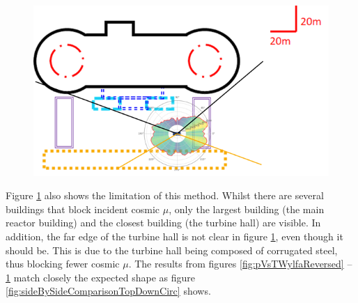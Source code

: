  \begin{figure}[!h]
 \centering
 \includegraphics[width=0.7\linewidth]{Chapter5/Figs/wylfaRasterNew/wylfaCircular0-37.5Deg_Overlay.png}
 \label{fig:wylfaCircular0-37.5Deg_Overlay}
\end{figure}

Figure \ref{fig:wylfaCircular0-37.5Deg_Overlay} also shows the limitation of this method. Whilst there are several buildings that block incident cosmic $\mu$, only the largest building (the main reactor building) and the closest building (the turbine hall) are visible. In addition, the far edge of the turbine hall is not clear in figure \ref{fig:wylfaCircular0-37.5Deg_Overlay}, even though it should be. This is due to the turbine hall being composed of corrugated steel, thus blocking fewer cosmic $\mu$. The results from figures \ref{fig:pVsTWylfaReversed} -- \ref{fig:wylfaCircular0-37.5Deg_Overlay} match closely the expected shape as figure \ref{fig:sideBySideComparisonTopDownCirc} shows. 


